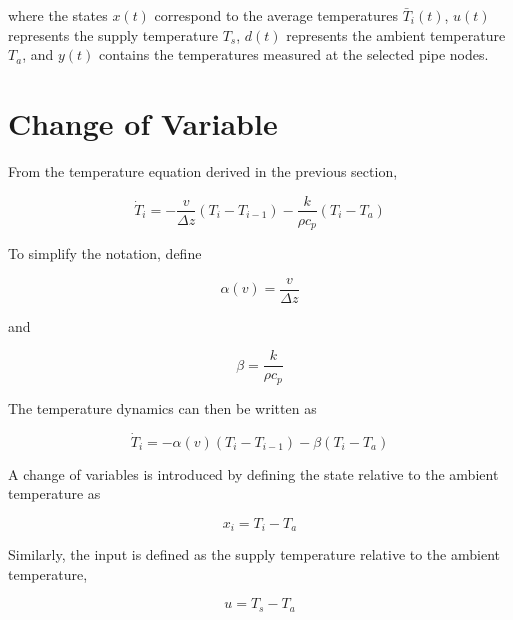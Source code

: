 where the states \(x(t)\) correspond to the average temperatures
\(\bar{T}_i(t)\), \(u(t)\) represents the supply temperature \(T_s\),
\(d(t)\) represents the ambient temperature \(T_a\), and \(y(t)\) contains
the temperatures measured at the selected pipe nodes.


\section{Change of Variable}
\label{sec:district_heating_change_variable}

From the temperature equation derived in the previous section,

\begin{equation}
    \dot{T}_i
    =
    -
    \frac{v}{\Delta z}
    \left(
        T_i-T_{i-1}
    \right)
    -
    \frac{k}{\rho c_p}
    \left(
        T_i-T_a
    \right)
\end{equation}

To simplify the notation, define

\begin{equation}
    \alpha(v)
    =
    \frac{v}{\Delta z}
\end{equation}

and

\begin{equation}
    \beta
    =
    \frac{k}{\rho c_p}
\end{equation}

The temperature dynamics can then be written as

\begin{equation}
    \dot{T}_i
    =
    -
    \alpha(v)
    \left(
        T_i-T_{i-1}
    \right)
    -
    \beta
    \left(
        T_i-T_a
    \right)
    \label{eq:temperature_alpha_beta}
\end{equation}

A change of variables is introduced by defining the state relative to the
ambient temperature as

\begin{equation}
    x_i
    =
    T_i-T_a
    \label{eq:change_state}
\end{equation}

Similarly, the input is defined as the supply temperature relative to the
ambient temperature,

\begin{equation}
    u
    =
    T_s-T_a
    \label{eq:change_input}
\end{equation}

